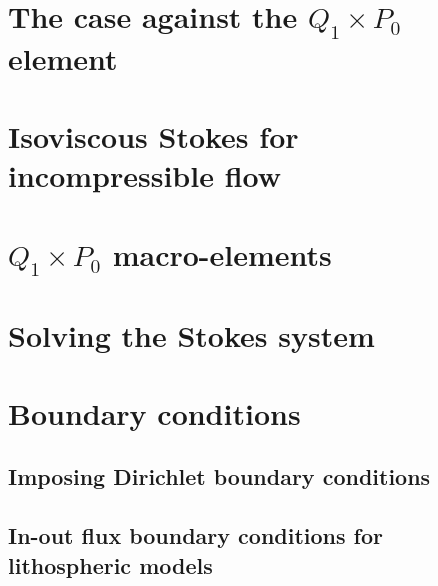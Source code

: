 \newpage %
\section{The case against the $Q_1\times P_0$ element}  %

\newpage %
\section{Isoviscous Stokes for incompressible flow}\label{ss:isovisc}  %

\newpage %
\section{$Q_1\times P_0$ macro-elements} \label{ss:meshtopos}  %

\newpage %
\section{Solving the Stokes system \label{sec:solvers}}  %

\newpage %
\section{Boundary conditions}
\subsection{Imposing Dirichlet boundary conditions \label{ss:howtobc}}  %
\newpage %
\subsection{In-out flux boundary conditions for lithospheric models}\label{kin_bc}  
\newpage %
